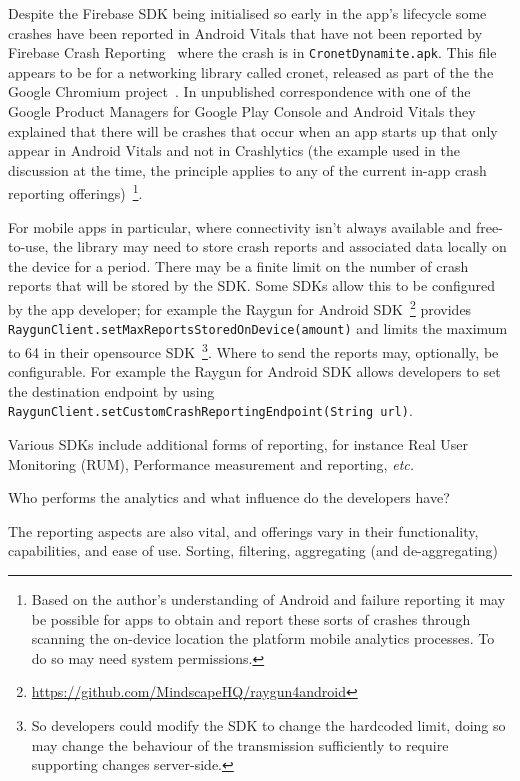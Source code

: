 Despite the Firebase SDK being initialised so early in the app's lifecycle some crashes have been reported in Android Vitals that have not been reported by Firebase Crash Reporting~\citep{so2021_shankar_strange_crash_in_cronetDynamite.apk} where the crash is in \texttt{CronetDynamite.apk}. This file appears to be for a networking library called cronet, released as part of the the Google Chromium project~\citep{android_cronet_library}. In unpublished correspondence with one of the Google Product Managers for Google Play Console and Android Vitals they explained that there will be crashes that occur when an app starts up that only appear in Android Vitals and not in Crashlytics (the example used in the discussion at the time, the principle applies to any of the current in-app crash reporting offerings)~\footnote{Based on the author's understanding of Android and failure reporting it may be possible for apps to obtain and report these sorts of crashes through scanning the on-device location the platform mobile analytics processes. To do so may need system permissions.}.

For mobile apps in particular, where connectivity isn't always available and free-to-use, the library may need to store crash reports and associated data locally on the device for a period. There may be a finite limit on the number of crash reports that will be stored by the SDK. Some SDKs allow this to be configured by the app developer; for example the Raygun for Android SDK~\footnote{\url{https://github.com/MindscapeHQ/raygun4android}} provides \texttt{RaygunClient.setMaxReportsStoredOnDevice(amount)} and limits the maximum to 64 in their opensource SDK~\footnote{So developers could modify the SDK to change the hardcoded limit, doing so may change the behaviour of the transmission sufficiently to require supporting changes server-side.}. Where to send the reports may, optionally, be configurable. For example the Raygun for Android SDK allows developers to set the destination endpoint by using \texttt{RaygunClient.setCustomCrashReportingEndpoint(String url)}.

Various SDKs include additional forms of reporting, for instance Real User Monitoring (RUM), Performance measurement and reporting, \emph{etc.} %

Who performs the analytics and what influence do the developers have?

The reporting aspects are also vital, and offerings vary in their functionality, capabilities, and ease of use. Sorting, filtering, aggregating (and de-aggregating) 

